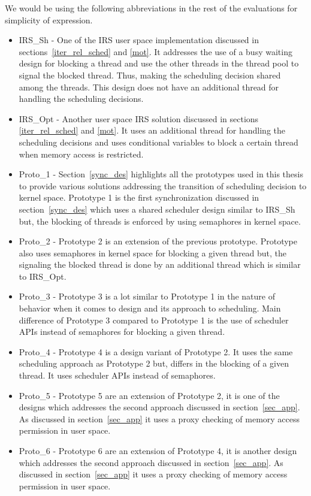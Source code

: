 We would be using the following abbreviations in the rest of the evaluations for simplicity of expression.
\begin{itemize}
\item {IRS\_Sh} - One of the IRS user space implementation discussed in sections~\ref{iter_rel_sched} and \ref{mot}. 
It addresses the use of a busy waiting design for blocking a thread and use the other threads in the thread pool to signal the blocked thread. 
Thus, making the scheduling decision shared among the threads. 
This design does not have an additional thread for handling the scheduling decisions. 
\item {IRS\_Opt} - Another user space IRS solution discussed in sections~ \ref{iter_rel_sched} and \ref{mot}. 
It uses an additional thread for handling the scheduling decisions and uses conditional variables to block a certain thread when memory access is restricted. 
\item {Proto\_1} - Section~\ref{sync_des} highlights all the prototypes used in this thesis to provide various solutions addressing the transition of scheduling decision to kernel space. 
Prototype 1 is the first synchronization discussed in section~\ref{sync_des} which uses a shared scheduler design similar to IRS\_Sh but, the blocking of threads is enforced by using semaphores in kernel space. 
\item {Proto\_2} - Prototype 2 is an extension of the previous prototype. 
Prototype also uses semaphores in kernel space for blocking a given thread but, the signaling the blocked thread is done by an additional thread which is similar to IRS\_Opt.
\item {Proto\_3} - Prototype 3 is a lot similar to Prototype 1 in the nature of behavior when it comes to design and its approach to scheduling. 
Main difference of Prototype 3 compared to Prototype 1 is the use of scheduler APIs instead of semaphores for blocking a given thread. 
\item {Proto\_4} - Prototype 4 is a design variant of Prototype 2. It uses the same scheduling approach as Prototype 2 but, differs in the blocking of a given thread. 
It uses scheduler APIs instead of semaphores. 
\item {Proto\_5} - Prototype 5 are an extension of Prototype 2, it is one of the designs which addresses the second approach discussed in section~\ref{sec_app}. 
As discussed in section~\ref{sec_app} it uses a proxy checking of memory access permission in user space.
\item {Proto\_6} - Prototype 6 are an extension of Prototype 4, it is another design which addresses the second approach discussed in section~\ref{sec_app}. 
As discussed in section~\ref{sec_app} it uses a proxy checking of memory access permission in user space.

\end{itemize}

